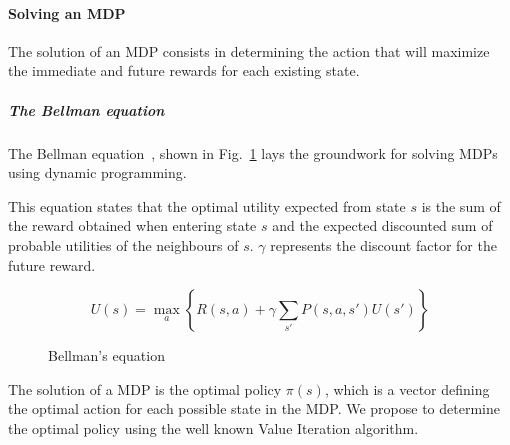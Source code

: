 \paragraph{Solving an MDP}
\label{sec:optimalpolicy}
The solution of an MDP consists in determining the action that will maximize the immediate and future rewards for each existing state.

\subparagraph{The Bellman equation}
The Bellman equation~\cite{bellman1957}, shown in Fig.~\ref{fig:bellmaneq} lays the groundwork for solving MDPs using dynamic programming.



This equation states that the optimal utility expected from state $s$ is the sum of the reward obtained when entering state $s$ and the expected discounted sum of probable utilities of the neighbours of $s$. $\gamma$ represents the discount factor for the future reward.

\begin{figure}[h]
\[ U(s) = \max\limits_a \left \{R(s,a) + \gamma   \sum\limits_{s'} P(s,a,s')U(s') \right \} \]

\setlength\abovecaptionskip{-2ex}
\setlength\belowcaptionskip{-3ex}
\caption{Bellman's equation}
\label{fig:bellmaneq}
\end{figure}

The solution of a MDP is the optimal policy $\pi(s)$, which is a vector defining the optimal action for each possible state in the MDP.
We propose to determine the optimal policy using the well known Value Iteration algorithm.

